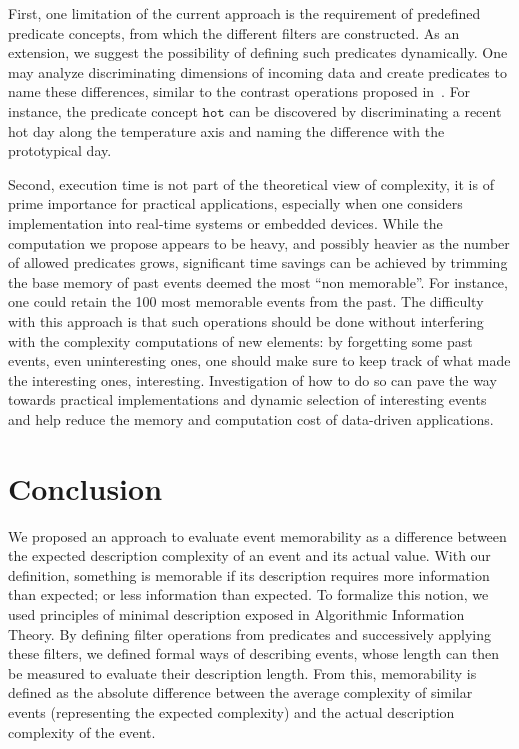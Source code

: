\documentclass[entropy,article,submit,moreauthors,pdftex]{Definitions/mdpi}
\begin{document}
First, one limitation of the current approach is the requirement of
predefined predicate concepts, from which the different filters are constructed.
As an extension, we suggest the possibility of defining such predicates dynamically.
One may analyze discriminating
dimensions of incoming data and create predicates to name these differences,
similar to the contrast operations proposed in~\cite{dessalles_conceptual_2015,
    gardenfors2004conceptual}. For instance, the predicate concept $\mathtt{hot}$
can be discovered by discriminating a recent hot day along the
temperature axis and naming the difference with the prototypical day\cite{pol_multi-level_2021}.


Second, execution time is not part of the theoretical view of complexity, it
is of prime importance for practical applications, especially when one considers
implementation into real-time systems or embedded devices. While the computation
we propose appears to be heavy, and possibly heavier as the number of allowed
predicates grows, significant time savings can be achieved by trimming the base
memory of past events deemed the most ``non memorable''. For instance, one could retain
the 100 most memorable events from the past. The difficulty with
this approach is that such operations should be done without interfering with the complexity computations of new elements: by forgetting some
past events, even uninteresting ones, one should make sure to keep track of what
made the interesting ones, interesting. Investigation of how to do so can pave
the way towards practical implementations and dynamic selection of interesting
events and help reduce the memory and computation cost of data-driven applications.


\section{Conclusion}

We proposed an approach to evaluate event memorability as a difference between the expected description complexity of an event and its actual value. With our definition, something is memorable if its description requires more information than expected; or less information than expected. To formalize this notion, we used principles of minimal description exposed in Algorithmic Information Theory. By defining filter operations from predicates and successively applying these filters, we defined formal ways of describing events, whose length can then be measured to evaluate their description length. From this, memorability is defined as the absolute difference between the average complexity of similar events (representing the expected complexity) and the actual description complexity of the event.
\end{document}
